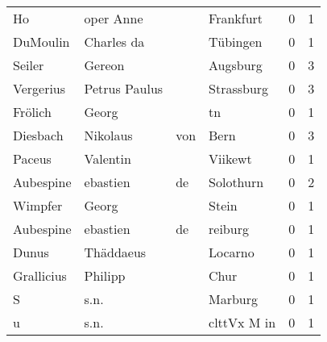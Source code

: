 \begin{center}
\begin{tiny}
\begin{longtabu}{llllrr}
                       Ho &                          oper Anne &             &                                   Frankfurt &          0 &         1 \\
                 DuMoulin &                         Charles da &             &                                    Tübingen &          0 &         1 \\
                   Seiler &                             Gereon &             &                                    Augsburg &          0 &         3 \\
                Vergerius &                      Petrus Paulus &             &                                  Strassburg &          0 &         3 \\
                  Frölich &                              Georg &             &                                          tn &          0 &         1 \\
                 Diesbach &                           Nikolaus &         von &                                        Bern &          0 &         3 \\
                   Paceus &                           Valentin &             &                                     Viikewt &          0 &         1 \\
                Aubespine &                           ebastien &          de &                                   Solothurn &          0 &         2 \\
                  Wimpfer &                              Georg &             &                                       Stein &          0 &         1 \\
                Aubespine &                           ebastien &          de &                                     reiburg &          0 &         1 \\
                    Dunus &                          Thäddaeus &             &                                     Locarno &          0 &         1 \\
               Grallicius &                            Philipp &             &                                        Chur &          0 &         1 \\
                        S &                               s.n. &             &                                     Marburg &          0 &         1 \\
                        u &                               s.n. &             &                                 clttVx M in &          0 &         1 \\

\end{longtabu}
\end{tiny}
\end{center}
